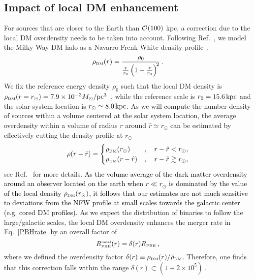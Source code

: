 \documentclass[11pt,a4paper]{article}
\newcommand{\be}{\begin{equation}}
\newcommand{\ee}{\end{equation}}
\newcommand{\kpc}{{\rm kpc}}
\begin{document}
\subsection{Impact of local DM enhancement}
\label{sec:DMenhancement}

For sources that are closer to the Earth than ${\cal O}(100)$ kpc, a correction due to the local DM overdensity needs to be taken into account. 
Following Ref.~\cite{Pujolas:2021yaw}, we model the Milky Way DM halo 
as a Navarro-Frenk-White density profile~\cite{Navarro:1995iw,Navarro:1996gj},
\be
	\rho_\text{\tiny{DM}}(r) = \frac{\rho_0}{\frac{r}{r_0} \left(1+\frac{r}{r_0}\right)^{\!2}} \,.
\ee
We fix the reference energy density $\rho_0$ 
such that the local DM density is 
$\rho_\text{\tiny DM}(r=r_\odot) = 7.9\times 10^{-3}M_\odot/{\rm pc}^3$~\cite{Cautun:2019eaf}, 
while the reference scale is $r_0 = 15.6\, \kpc$ and the solar system location is $r_\odot \simeq  8.0\,\kpc$. 
As we will compute the number density of sources within a volume centered at the solar system location, the average overdensity within a volume of radius $r$ around $\hat r \simeq  r_\odot$ can be estimated by
effectively cutting the density profile at $r_\odot$
\begin{align}
	\rho(r-\hat r)=
\begin{cases}
		\rho_\text{\tiny DM}(r_\odot)   &,   \quad   r-\hat r < r_\odot,	
\\
		\rho_\text{\tiny DM}( r-\hat r)         &,   \quad   r-\hat r \gtrsim  r_\odot,
\end{cases}
\end{align}
see Ref.~\cite{Pujolas:2021yaw} for more details.
\textcolor{black}{As the volume average of the dark matter overdensity around an observer located on the earth when $r \ll r_\odot$ is dominated by the value 
of the local density $\rho_\text{\tiny DM}(r_\odot)$, it follows that our estimates are not much sensitive to deviations from the NFW profile at small scales towards the galactic center (e.g. cored DM profiles). }
As we expect the distribution of binaries to follow the large/galactic scales, 
the local DM overdensity enhances the merger rate in Eq.~\eqref{PBHrate} by an overall factor of 
\begin{equation}
\label{eq:Rlocal}
	R_\text{\tiny PBH} ^\text{\tiny local} (r) = \delta (r) R_\text{\tiny PBH} \,,
\end{equation}
where we defined the overdensity factor $\delta(r) \equiv \rho_\text{\tiny DM}(r)/\bar \rho_\text{\tiny DM}$. 
Therefore, one finds that this correction falls within the range
$
	\delta(r) \subset(1 \div 2 \times 10^5) \,	
$.
\end{document}
